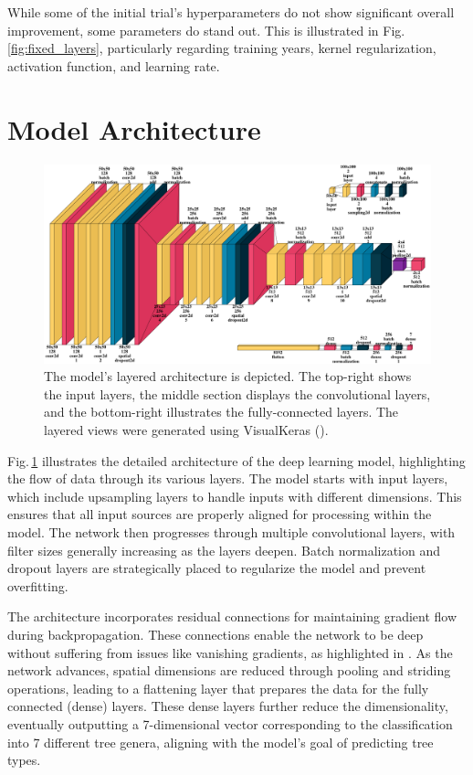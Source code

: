 While some of the initial trial's hyperparameters do not show significant overall improvement, some parameters do stand out. This is illustrated in Fig.\,\ref{fig:fixed_layers}, particularly regarding training years, kernel regularization, activation function, and learning rate.

\section{Model Architecture}

\begin{figure}[ht]
    \centering
    \includegraphics[width=0.9\linewidth]{figures/figures_tuner/model_layered_view.png}
    \caption{The model's layered architecture is depicted. The top-right shows the input layers, the middle section displays the convolutional layers, and the bottom-right illustrates the fully-connected layers. The layered views were generated using VisualKeras (\cite{visualkeras}).}
    \label{fig:model_layered_view}
\end{figure}

Fig.\,\ref{fig:model_layered_view} illustrates the detailed architecture of the deep learning model, highlighting the flow of data through its various layers. The model starts with input layers, which include upsampling layers to handle inputs with different dimensions. This ensures that all input sources are properly aligned for processing within the model. The network then progresses through multiple convolutional layers, with filter sizes generally increasing as the layers deepen. Batch normalization and dropout layers are strategically placed to regularize the model and prevent overfitting.

The architecture incorporates residual connections for maintaining gradient flow during backpropagation. These connections enable the network to be deep without suffering from issues like vanishing gradients, as highlighted in \cite{resnet}. As the network advances, spatial dimensions are reduced through pooling and striding operations, leading to a flattening layer that prepares the data for the fully connected (dense) layers. These dense layers further reduce the dimensionality, eventually outputting a 7-dimensional vector corresponding to the classification into 7 different tree genera, aligning with the model's goal of predicting tree types.
